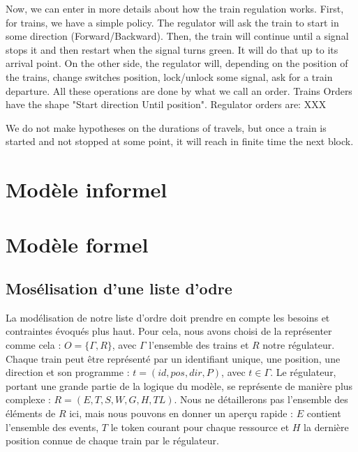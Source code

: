 \documentclass[runningheads]{llncs}
\begin{document}
 Now, we can enter in more details about how the train regulation works. First, for trains, we have a simple policy.  The regulator will ask the train to start in some direction (Forward/Backward). Then, the train will continue until a signal stops it and then restart when the signal turns green. It will do that up to its arrival point. On the other side, the regulator will, depending on the position of the trains, change switches position, lock/unlock some signal, ask for a train departure. All these operations are done by what we call an order. Trains Orders have the shape "Start direction Until position". Regulator orders are: XXX
 
  We do not make hypotheses on the durations of travels, but once a train is started and not stopped at some point, it will reach in finite time the next block. 
 
 
 
 





\section{Modèle informel}
\label{sec:informal-model}


\newpage

\section{Modèle formel}
\label{sec:formal-model}


\subsection{Mosélisation d'une liste d'odre}
La modélisation de notre liste d'ordre doit prendre en compte les besoins et contraintes évoqués plus haut.
Pour cela, nous avons choisi de la représenter comme cela : $O = \{\Gamma, R\}$, avec $\Gamma$ l'ensemble des trains et $R$ notre régulateur.
Chaque train peut être représenté par un identifiant unique, une position, une direction et son programme : $t = (id, pos, dir, P)$, avec $t \in \Gamma$.
Le régulateur, portant une grande partie de la logique du modèle, se représente de manière plus complexe : $R = (E,T,S,W,G,H,TL)$.
Nous ne détaillerons pas l'ensemble des éléments de $R$ ici, mais nous pouvons en donner un aperçu rapide : $E$ contient l'ensemble des events,
$T$ le token courant pour chaque ressource et $H$ la dernière position connue de chaque train par le régulateur.
\end{document}
